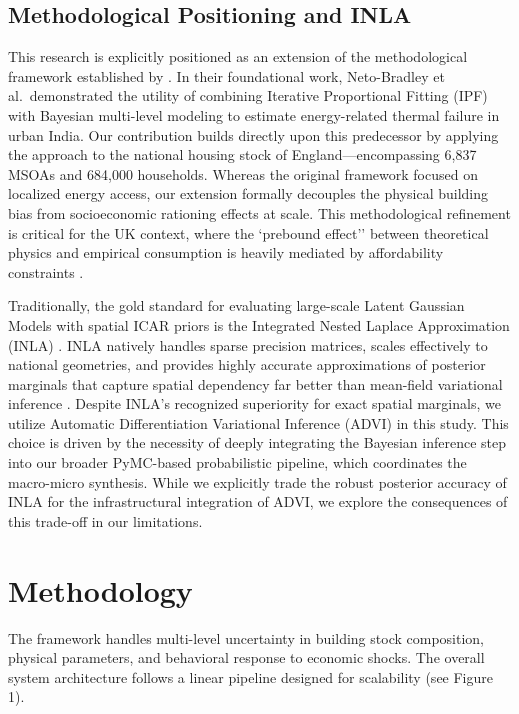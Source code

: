 \documentclass[11pt, a4paper, twocolumn]{article}
\begin{document}
\subsection{Methodological Positioning and INLA}\label{methodological-positioning}

This research is explicitly positioned as an extension of the 
methodological framework established by \cite{Booth2013}. 
In their foundational work, Neto-Bradley et al.~demonstrated the utility 
of combining Iterative Proportional Fitting (IPF) with Bayesian multi-level modeling 
to estimate energy-related thermal failure in urban India. Our 
contribution builds directly upon this predecessor by applying the 
approach to the national housing stock of England---encompassing 6,837 MSOAs 
and 684,000 households. Whereas the original framework focused on localized energy 
access, our extension formally decouples the physical building bias from 
socioeconomic rationing effects at scale. This methodological refinement is 
critical for the UK context, where the `prebound effect'' between 
theoretical physics and empirical consumption is heavily mediated by 
affordability constraints \cite{SunikkaBlank2012}.

Traditionally, the gold standard for evaluating large-scale Latent Gaussian Models with spatial ICAR priors is the Integrated Nested Laplace Approximation (INLA) \cite{Rue2009}. INLA natively handles sparse precision matrices, scales effectively to national geometries, and provides highly accurate approximations of posterior marginals that capture spatial dependency far better than mean-field variational inference \cite{Simpson2017}. Despite INLA's recognized superiority for exact spatial marginals, we utilize Automatic Differentiation Variational Inference (ADVI) \cite{Kucukelbir2017} in this study. This choice is driven by the necessity of deeply integrating the Bayesian inference step into our broader PyMC-based probabilistic pipeline, which coordinates the macro-micro synthesis. While we explicitly trade the robust posterior accuracy of INLA for the infrastructural integration of ADVI, we explore the consequences of this trade-off in our limitations.

\section{Methodology}\label{methodology-bayesian-computational-architecture}

The framework handles multi-level uncertainty in building stock 
composition, physical parameters, and behavioral response to economic 
shocks. The overall system architecture follows a linear pipeline 
designed for scalability (see Figure 1).
\end{document}

